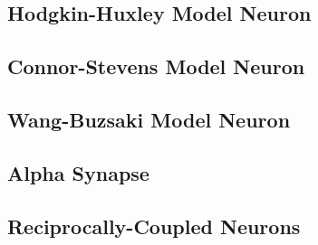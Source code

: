 \subsection{Hodgkin-Huxley Model Neuron}


\subsection{Connor-Stevens Model Neuron}


\subsection{Wang-Buzsaki Model Neuron}


\subsection{Alpha Synapse}


\subsection{Reciprocally-Coupled Neurons}
